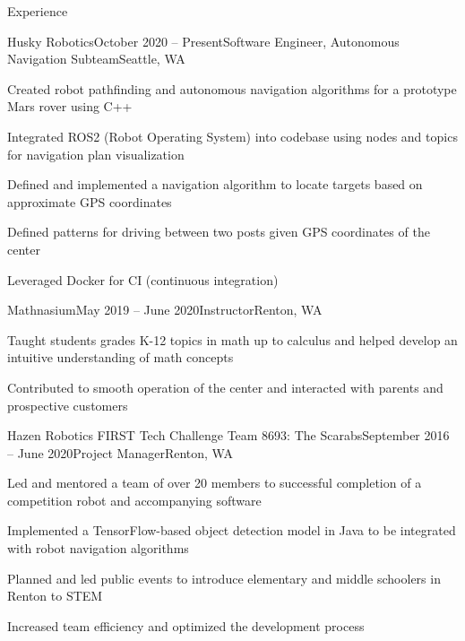 \documentclass{resume} %
\begin{document}
\begin{rSection}{Experience}

\begin{rSubsection}{Husky Robotics}{October 2020 – Present}{Software Engineer, Autonomous Navigation Subteam}{Seattle, WA}
\item Created robot pathfinding and autonomous navigation algorithms for a prototype Mars rover using C++
\item Integrated ROS2 (Robot Operating System) into codebase using nodes and topics for navigation plan visualization
\item Defined and implemented a navigation algorithm to locate targets based on approximate GPS coordinates
\item Defined patterns for driving between two posts given GPS coordinates of the center
\item Leveraged Docker for CI (continuous integration)
\end{rSubsection}

\begin{rSubsection}{Mathnasium}{May 2019 – June 2020}{Instructor}{Renton, WA}
\item Taught students grades K-12 topics in math up to calculus and helped develop an intuitive understanding of math concepts
\item Contributed to smooth operation of the center and interacted with parents and prospective customers
\end{rSubsection}

\begin{rSubsection}{Hazen Robotics FIRST Tech Challenge Team 8693: The Scarabs}{September 2016 – June 2020}{Project Manager}{Renton, WA}
\item Led and mentored a team of over 20 members to successful completion of a competition robot and accompanying software
\item Implemented a TensorFlow-based object detection model in Java to be integrated with robot navigation algorithms
\item Planned and led public events to introduce elementary and middle schoolers in Renton to STEM
\item Increased team efficiency and optimized the development process
\end{rSubsection}

%
\end{rSection}
\end{document}
